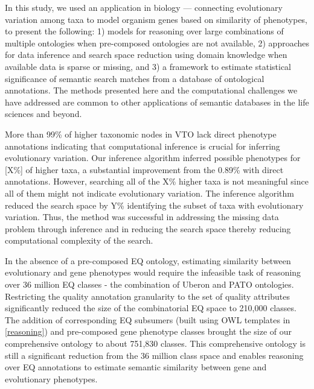 \documentclass{article}
\begin{document}
In this study, we used an application in biology — connecting evolutionary variation among taxa to model organism genes based on similarity of phenotypes, to present the following: 1) models for reasoning over large combinations of multiple ontologies when pre-composed ontologies are not available, 2) approaches for data inference and search space reduction using domain knowledge when available data is sparse or missing, and 3) a framework to estimate statistical significance of semantic search matches from a database of ontological annotations. The methods presented here and the computational challenges we have addressed are common to other applications of semantic databases in the life sciences and beyond.




More than 99\% of higher taxonomic nodes in VTO lack direct phenotype annotations indicating that computational inference is crucial for inferring evolutionary variation. Our inference algorithm inferred possible phenotypes for [X\%] of higher taxa, a substantial improvement from the 0.89\% with direct annotations. However, searching all of the X\% higher taxa is not meaningful since all of them might not indicate evolutionary variation. The inference algorithm reduced the search space by Y\% identifying the subset of taxa with evolutionary variation. Thus, the method was successful in addressing the missing data problem through inference and in reducing the search space thereby reducing computational complexity of the search.

In the absence of a pre-composed EQ ontology, estimating similarity between evolutionary and gene phenotypes would require the infeasible task of reasoning over 36 million EQ classes - the combination of Uberon and PATO ontologies. Restricting the quality annotation granularity to the set of quality attributes significantly reduced the size of the combinatorial EQ space to 210,000 classes. The addition of corresponding EQ subsumers (built using OWL templates in \ref{reasoning}) and pre-composed gene phenotype classes brought the size of our comprehensive ontology to about 751,830 classes. This comprehensive ontology is still a significant reduction from the 36 million class space and enables reasoning over EQ annotations to estimate semantic similarity between gene and evolutionary phenotypes. 
\end{document}
